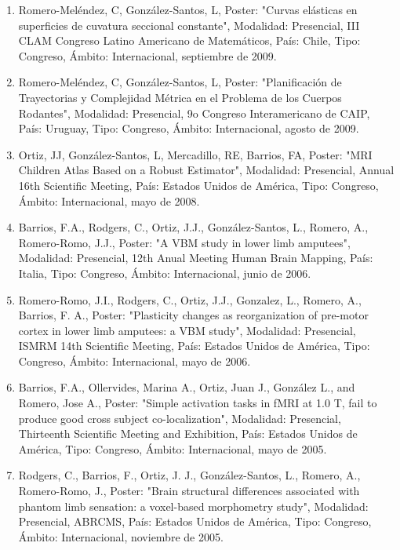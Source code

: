 \documentclass[12pt]{article}
\begin{document}
\begin{enumerate}
\item Romero-Meléndez, C, González-Santos, L, Poster: "Curvas elásticas en superficies de cuvatura seccional constante", Modalidad: 
Presencial, III CLAM Congreso Latino Americano de Matemáticos, País: Chile, Tipo: Congreso, Ámbito: Internacional, septiembre de 2009.

\item Romero-Meléndez, C, González-Santos, L, Poster: "Planificación de Trayectorias y Complejidad Métrica en el Problema de los 
Cuerpos 
Rodantes", Modalidad: Presencial, 9o Congreso Interamericano de CAIP, País: Uruguay, Tipo: Congreso, Ámbito: Internacional, agosto de 
2009.

\item Ortiz, JJ, González-Santos, L, Mercadillo, RE, Barrios, FA, Poster: "MRI Children Atlas Based on a Robust Estimator", Modalidad: 
Presencial, Annual 16th Scientific Meeting, País: Estados Unidos de América, Tipo: Congreso, Ámbito: Internacional, mayo de 2008.

\item Barrios, F.A., Rodgers, C., Ortiz, J.J., González-Santos, L., Romero, A., Romero-Romo, J.J., Poster: "A VBM study in lower limb 
amputees", Modalidad: Presencial, 12th Anual Meeting Human Brain Mapping, País: 
Italia, Tipo: Congreso, Ámbito: Internacional, junio de 2006.

\item Romero-Romo, J.I., Rodgers, C., Ortiz, J.J., Gonzalez, L., Romero, A., Barrios, F. A., Poster: "Plasticity changes as 
reorganization of pre-motor cortex in lower limb amputees: a VBM study", Modalidad: Presencial, ISMRM 14th Scientific Meeting, País: 
Estados Unidos de América, Tipo: Congreso, Ámbito: Internacional, mayo de 2006.

\item Barrios, F.A., Ollervides, Marina A., Ortiz, Juan J., González L., and Romero, Jose A., Poster: "Simple activation tasks in fMRI 
at 
1.0 T, fail to produce good cross subject co-localization", Modalidad: Presencial, Thirteenth Scientific Meeting and Exhibition, País: 
Estados Unidos de América, Tipo: Congreso, Ámbito: Internacional, mayo de 2005.

\item Rodgers, C., Barrios, F., Ortiz, J. J., González-Santos, L., Romero, A., Romero-Romo, J., Poster: "Brain structural differences 
associated with phantom limb sensation: a voxel-based morphometry study", Modalidad: Presencial, ABRCMS, País: Estados Unidos de 
América, Tipo: Congreso, Ámbito: Internacional, noviembre de 2005.


\end{enumerate}
\end{document}
